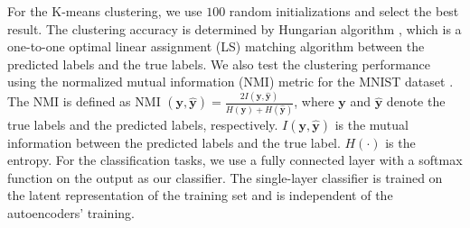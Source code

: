 \documentclass[letterpaper]{article} %
\begin{document}
 For the K-means clustering, we use $100$ random initializations and select the best result. The clustering accuracy is determined by Hungarian algorithm \cite{xie:16:icml}, which is a one-to-one optimal linear assignment (LS) matching algorithm between the predicted labels and the true labels. We also test the clustering performance using the normalized mutual information (NMI) metric for the MNIST dataset \cite{Somvae} \cite{DBLP:journals/corr/abs-1801-07648}. The NMI is defined as NMI $(\mathbf{y}, \hat{\mathbf{y}}) = \frac{2I(\mathbf{y}, \hat{\mathbf{y}})}{H(\mathbf{y}) + H(\hat{\mathbf{y}})}$, where $\mathbf{y}$ and $\hat{\mathbf{y}}$ denote the true labels and the predicted labels, respectively. $I(\mathbf{y}, \hat{\mathbf{y}})$ is the mutual information between the predicted labels and the true label. $H(\cdot)$ is the entropy. For the classification tasks, we use a fully connected layer with a softmax function on the output as our classifier. The single-layer classifier is trained on the latent representation of the training set and is independent of the autoencoders' training.
\begin{table}[!ht]
	\caption{Accuracy of downstream tasks of MNIST.}
	\centering
	\label{MNIST_table}
\end{table}
\end{document}
